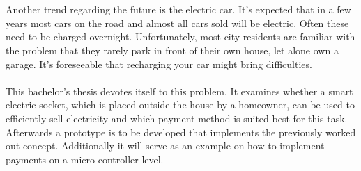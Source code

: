 \\\\
Another trend regarding the future is the electric car. It's expected that in a few years most cars on the road and almost all cars sold will be electric. Often these need to be charged overnight. Unfortunately, most city residents are familiar with the problem that they rarely park in front of their own house, let alone own a garage. It's foreseeable that recharging your car might bring difficulties.
\\\\ 
This bachelor's thesis devotes itself to this problem. It examines whether a smart electric socket, which is placed outside the house by a homeowner, can be used to efficiently sell electricity and which payment method is suited best for this task. Afterwards a prototype is to be developed that implements the previously worked out concept. Additionally it will serve as an example on how to implement  payments on a micro controller level.